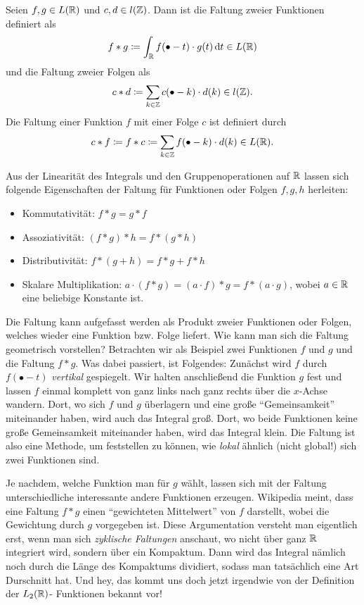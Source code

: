 \begin{definition}[Faltung]
Seien $ f, g \in L(\mathbb{R}) $ und $ c,d \in l(\mathbb{Z}) $. Dann ist die Faltung zweier Funktionen definiert als
\[
  f * g \coloneqq \int_{\R} f(\bullet - t) \cdot g(t) \dif t \in L(\R)
\]
und die Faltung zweier Folgen als
\[
  c * d \coloneqq \sum_{k \in \mathbb{Z}} c(\bullet - k) \cdot d(k) \in l(\mathbb{Z}).
\]
Die Faltung einer Funktion $ f $ mit einer Folge $ c $ ist definiert durch
\[
  c * f \coloneqq f * c \coloneqq \sum_{k \in \mathbb{Z}} f(\bullet - k) \cdot d(k) \in L(\mathbb{R}).
\]
\end{definition}

\begin{remark}
Aus der Linearität des Integrals und den Gruppenoperationen auf $ \mathbb{R} $ lassen sich folgende 
Eigenschaften der Faltung für Funktionen oder Folgen $ f, g, h $ herleiten:
\begin{itemize}
\item Kommutativität: $ f * g = g * f $
\item Assoziativität: $ (f * g) * h = f * (g * h) $
\item Distributivität: $ f * (g + h) = f * g + f * h $
\item Skalare Multiplikation: $ a \cdot (f * g) = (a \cdot f) * g = f * (a \cdot g) $, wobei
  $ a \in \mathbb{R} $ eine beliebige Konstante ist.
\end{itemize}
\end{remark}
\begin{remark}
Die Faltung kann aufgefasst werden als Produkt zweier Funktionen oder Folgen, welches wieder eine
Funktion bzw. Folge liefert. Wie kann man sich die Faltung geometrisch vorstellen? Betrachten wir 
als Beispiel zwei Funktionen $ f $ und $ g $ und die Faltung $ f * g $. Was dabei passiert, ist 
Folgendes: Zunächst wird $ f $ durch $ f(\bullet - t) $ \emph{vertikal} gespiegelt. Wir halten 
anschließend die Funktion $ g $ fest und lassen $ f $ einmal komplett von ganz links nach 
ganz rechts über die $ x $-Achse wandern. Dort, wo sich $ f $ und $ g $ überlagern und eine große 
\enquote{Gemeinsamkeit} miteinander haben, wird auch das Integral groß. Dort, wo beide Funktionen 
keine große Gemeinsamkeit miteinander haben, wird das Integral klein. Die Faltung ist also eine 
Methode, um feststellen zu können, wie \emph{lokal} ähnlich (nicht global!) sich zwei Funktionen 
sind.

Je nachdem, welche Funktion man für $ g $ wählt, lassen sich mit der Faltung unterschiedliche 
interessante andere Funktionen erzeugen. Wikipedia meint, dass eine Faltung $ f * g $ einen
\enquote{gewichteten Mittelwert} von $ f $ darstellt, wobei die Gewichtung durch $ g $ vorgegeben 
ist. Diese Argumentation versteht man eigentlich erst, wenn man sich \emph{zyklische Faltungen}
anschaut, wo nicht über ganz $ \mathbb{R} $ integriert wird, sondern über ein Kompaktum. Dann wird das
Integral nämlich noch durch die Länge des Kompaktums dividiert, sodass man tatsächlich eine Art
Durschnitt hat. Und hey, das kommt uns doch jetzt irgendwie von der Definition der $ L_{2}(\mathbb{R}) $-
Funktionen bekannt vor!
\end{remark}

